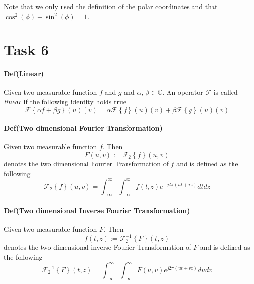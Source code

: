 \documentclass{paper}
\begin{document}
Note that we only used the definition of the polar coordinates and that $\cos^2(\phi) + \sin^2(\phi) = 1$. \\




\section*{Task 6}
\paragraph{Def(Linear)} Given two measurable function $f$ and $g$ and $\alpha$, $\beta \in \mathbb{C}$. An operator $\mathcal{F}$ is called $\emph{linear}$ if the following identity holds true: \\
\begin{equation}
    \mathcal{F} \left \{\alpha f + \beta g \right\}(u)(v) = \alpha \mathcal{F} \left \{f\right\}(u)(v) + \beta \mathcal{F} \left \{g \right\}(u)(v)
\label{eq:lin_op}
\end{equation}

\paragraph{Def(Two dimensional Fourier Transformation)} Given two measurable function $f$. Then
\begin{equation}
    F(u,v) := \mathcal{F}_2 \left \{ f  \right\}(u,v)
\end{equation}
denotes the two dimensional Fourier Transformation of $f$ and is defined as the following \\
\begin{equation}
    \mathcal{F}_2 \left \{ f  \right\}(u,v) = \int_{-\infty}^{\infty} \int_{-\infty}^{\infty} f(t,z) e^{-j 2 \pi (ut+vz)} dt dz
\label{eq:fourier2}
\end{equation}

\paragraph{Def(Two dimensional Inverse Fourier Transformation)} Given two measurable function $F$. Then
\begin{equation}
    f(t,z) := \mathcal{F}^{-1}_{2} \left \{ F  \right\}(t,z)
\end{equation}
denotes the two dimensional inverse Fourier Transformation of $F$ and is defined as the following \\
\begin{equation}
    \mathcal{F}^{-1}_{2} \left \{ F \right\}(t,z) = \int_{-\infty}^{\infty} \int_{-\infty}^{\infty} F(u,v) e^{j 2 \pi (ut+vz)} du dv
\label{eq:fourier2}
\end{equation}
\end{document}
